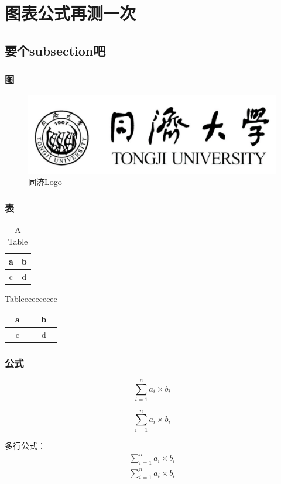\section{图表公式再测一次}

\subsection{要个subsection吧}

\subsubsection{图}
	\begin{figure}[h!]
		\centering
		\includegraphics[width=0.5\linewidth]{tongji-logo.png}
		\caption{同济Logo}
		\label{fig:tongji2}
	\end{figure}

\subsubsection{表}
		\begin{table}[h!]
		\centering
			\caption{A Table}
			\begin{tabular}{c|c}
			a & b \\ \hline
			c & d \\ \hline
			\end{tabular}
		\end{table}
		
		\begin{table}[h!]
			\centering
				\caption{Tableeeeeeeeee}
				\label{tb:test_tb2}
				\begin{tabular}{c|c}
				a & b \\ \hline
				c & d \\ \hline
				\end{tabular}
			\end{table}
			
\subsubsection{公式}
	\begin{equation}\label{eq:test2}
	\sum_{i=1}^n a_i \times b_i 
	\end{equation}
	
	\begin{equation}
		\sum_{i=1}^n a_i \times b_i 
		\end{equation}
		
	多行公式：
	\begin{eqnarray}
			\sum_{i=1}^n a_i \times b_i  \nonumber \\
				\sum_{i=1}^n a_i \times b_i 
	\end{eqnarray}
